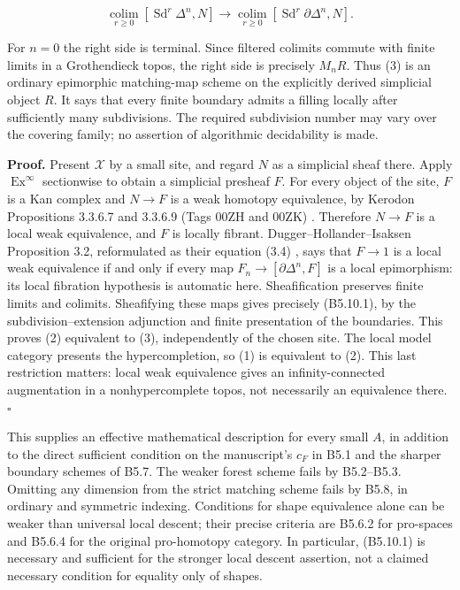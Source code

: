 \[\operatorname*{colim}_{r\ge0}[\operatorname{Sd}^{r}\Delta^n,N]
\longrightarrow
\operatorname*{colim}_{r\ge0}[\operatorname{Sd}^{r}\partial\Delta^n,N].\tag{B5.10.1}\]

For \(n=0\) the right side is terminal. Since filtered colimits commute
with finite limits in a Grothendieck topos, the right side is precisely
\(M_nR\). Thus (3) is an ordinary epimorphic matching-map scheme on the
explicitly derived simplicial object \(R\). It says that every finite
boundary admits a filling locally after sufficiently many subdivisions.
The required subdivision number may vary over the covering family; no
assertion of algorithmic decidability is made.

\textbf{Proof.} Present \(\mathcal X\) by a small site, and regard \(N\)
as a simplicial sheaf there. Apply \(\operatorname{Ex}^{\infty}\)
sectionwise to obtain a simplicial presheaf \(F\). For every object of
the site, \(F\) is a Kan complex and \(N\to F\) is a weak homotopy
equivalence, by Kerodon Propositions 3.3.6.7 and 3.3.6.9 (Tags 00ZH and
00ZK) \cite{B56KerodonExInfinity}. Therefore \(N\to F\) is a local weak
equivalence, and \(F\) is locally fibrant. Dugger--Hollander--Isaksen
Proposition 3.2, reformulated as their equation (3.4) \cite{B56DHI2004},
says that \(F\to1\) is a local weak equivalence if and only if every map
\(F_n\to[\partial\Delta^n,F]\) is a local epimorphism: its local
fibration hypothesis is automatic here. Sheafification preserves finite
limits and colimits. Sheafifying these maps gives precisely (B5.10.1),
by the subdivision--extension adjunction and finite presentation of the
boundaries. This proves (2) equivalent to (3), independently of the
chosen site. The local model category presents the hypercompletion, so
(1) is equivalent to (2). This last restriction matters: local weak
equivalence gives an infinity-connected augmentation in a
nonhypercomplete topos, not necessarily an equivalence there.
\(\square\)

This supplies an effective mathematical description for every small
\(A\), in addition to the direct sufficient condition on the
manuscript's \(c_F\) in B5.1 and the sharper boundary schemes of B5.7.
The weaker forest scheme fails by B5.2--B5.3. Omitting any dimension
from the strict matching scheme fails by B5.8, in ordinary and symmetric
indexing. Conditions for shape equivalence alone can be weaker than
universal local descent; their precise criteria are B5.6.2 for pro-spaces
and B5.6.4 for the original pro-homotopy category. In particular,
(B5.10.1) is necessary and sufficient for the stronger local descent
assertion, not a claimed necessary condition for equality only of shapes.

